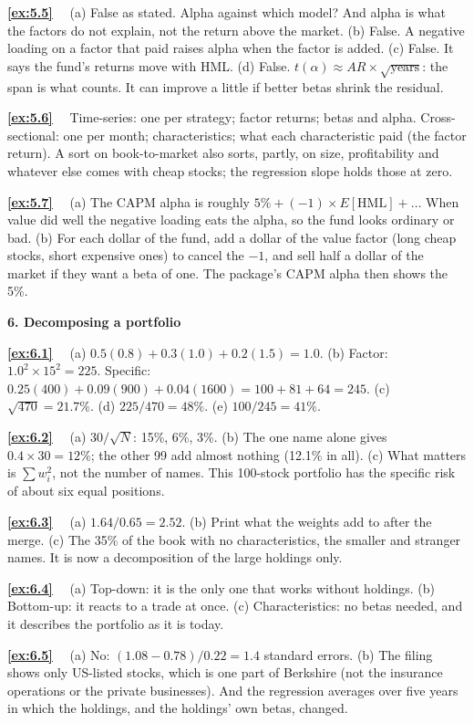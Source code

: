 \documentclass[11pt]{article}
\newcounter{ex}[section]
\newcommand{\sol}[1]{\par\smallskip\textbf{\ref{#1}}\ \ }
\newcommand{\head}[1]{\par\medskip\textbf{#1}\par}
\newcommand{\AR}{\mathit{AR}}
\begin{document}
{\sol{ex:5.5} (a) False as stated. Alpha against which model? And alpha is what the factors do not explain, not the
return above the market. (b) False. A negative loading on a factor that paid raises alpha when the factor is added.
(c) False. It says the fund's returns move with HML. (d) False. $t(\alpha) \approx \AR\times\sqrt{\text{years}}$: the span is
what counts. It can improve a little if better betas shrink the residual.

\sol{ex:5.6} Time-series: one per strategy; factor returns; betas and alpha. Cross-sectional: one per month;
characteristics; what each characteristic paid (the factor return). A sort on book-to-market also sorts, partly, on
size, profitability and whatever else comes with cheap stocks; the regression slope holds those at zero.

\sol{ex:5.7} (a) The CAPM alpha is roughly $5\% + (-1)\times E[\text{HML}] + \ldots$ When value did well the negative loading
eats the alpha, so the fund looks ordinary or bad. (b) For each dollar of the fund, add a dollar of the value factor
(long cheap stocks, short expensive ones) to cancel the $-1$, and sell half a dollar of the market if they want a beta of
one. The package's CAPM alpha then shows the 5\%.

\head{6. Decomposing a portfolio}

\sol{ex:6.1} (a) $0.5(0.8) + 0.3(1.0) + 0.2(1.5) = 1.0$. (b) Factor: $1.0^{2}\times 15^{2} = 225$. Specific:
$0.25(400) + 0.09(900) + 0.04(1600) = 100 + 81 + 64 = 245$. (c) $\sqrt{470} = 21.7\%$. (d) $225/470 = 48\%$. (e) $100/245 = 41\%$.

\sol{ex:6.2} (a) $30/\sqrt{N}$: 15\%, 6\%, 3\%. (b) The one name alone gives $0.4\times 30 = 12\%$; the other 99 add almost
nothing (12.1\% in all). (c) What matters is $\sum w_{i}^{2}$, not the number of names. This 100-stock portfolio has the
specific risk of about six equal positions.

\sol{ex:6.3} (a) $1.64/0.65 = 2.52$. (b) Print what the weights add to after the merge. (c) The 35\% of the book with no
characteristics, the smaller and stranger names. It is now a decomposition of the large holdings only.

\sol{ex:6.4} (a) Top-down: it is the only one that works without holdings. (b) Bottom-up: it reacts to a trade at once.
(c) Characteristics: no betas needed, and it describes the portfolio as it is today.

\sol{ex:6.5} (a) No: $(1.08 - 0.78)/0.22 = 1.4$ standard errors. (b) The filing shows only US-listed stocks, which is one
part of Berkshire (not the insurance operations or the private businesses). And the regression averages over five
years in which the holdings, and the holdings' own betas, changed.

}
\end{document}
